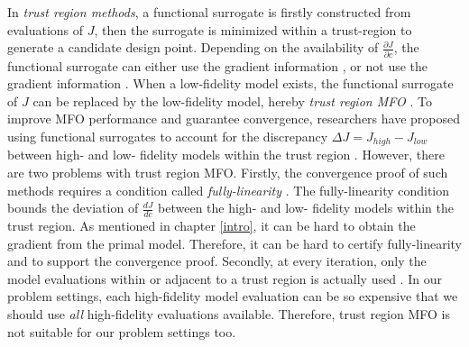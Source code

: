 \documentclass[a4paper,onecolumn]{article}
\theoremstyle{remark}
\begin{document}
\noindent In \emph{trust region methods}, a functional surrogate is firstly constructed from
evaluations of $J$, then the surrogate is minimized within a trust-region to generate
a candidate design point. Depending on the availability of $\frac{\partial J}{\partial c}$,
the functional surrogate can either use the gradient information \cite{inexactgradient1},
or not use the gradient information \cite{jones1998, trustregionconn, trustregionwild}.
When a low-fidelity model exists,
the functional surrogate of $J$ can be replaced by the low-fidelity model, hereby
\emph{trust region MFO} \cite{simplified physics, coarse discretization}.
To improve MFO performance and guarantee convergence,
researchers have proposed using functional surrogates to account for 
the discrepancy $\Delta J = J_{high} - J_{low}$
between high- and low- fidelity models within the trust region
\cite{andrewras, andrew thesis}. However, there are two problems with trust region MFO.
Firstly, the convergence proof of such methods requires
a condition called \emph{fully-linearity} \cite{trustregionconn}. The fully-linearity
condition bounds the deviation of $\frac{dJ}{dc}$ between the high- and low-
fidelity models within the trust region. As mentioned in
chapter \ref{intro}, it can be hard to obtain the gradient from the primal model.
Therefore, it can be hard to certify fully-linearity and to support 
the convergence proof.
Secondly, at every iteration, only the model evaluations within or adjacent
to a trust region is actually used \cite{andrew thesis}. In our problem settings,
each high-fidelity model evaluation can be so expensive that we should use \emph{all}
high-fidelity evaluations available.
Therefore, trust region MFO is not suitable for our problem settings too.\\
\end{document}
